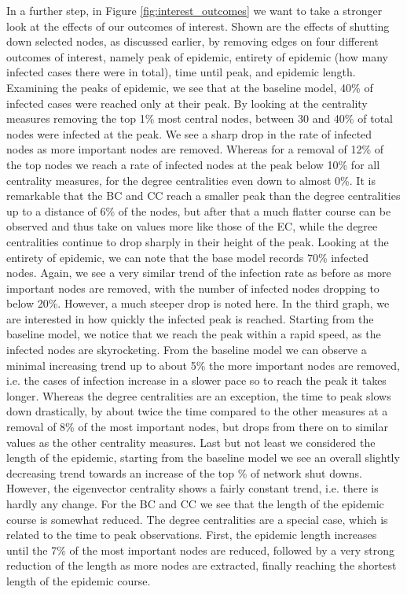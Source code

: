 \documentclass{Resources/netsci-project}
\begin{document}
In a further step, in Figure \ref{fig:interest_outcomes} we want to take a stronger look at the effects of our outcomes of interest. Shown are the effects of shutting down selected nodes, as discussed earlier, by removing edges on four different outcomes of interest, namely peak of epidemic, entirety of epidemic (how many infected cases there were in total), time until peak, and epidemic length.
Examining the peaks of epidemic, we see that at the baseline model, 40\%  of infected cases were reached only at their peak. By looking at the centrality measures removing the top 1\% most central nodes, between 30 and 40\%  of total nodes were infected at the peak. We see a sharp drop in the rate of infected nodes as more important nodes are removed. Whereas for a removal of 12\%  of the top nodes we reach a rate of infected nodes at the peak below 10\%  for all centrality measures, for the degree centralities even down to almost 0\%. It is remarkable that the BC and CC reach a smaller peak than the degree centralities up to a distance of 6\%  of the nodes, but after that a much flatter course can be observed and thus take on values more like those of the EC, while the degree centralities continue to drop sharply in their height of the peak.
Looking at the entirety of epidemic, we can note that the base model records 70\% infected nodes. Again, we see a very similar trend of the infection rate as before as more important nodes are removed, with the number of infected nodes dropping to below 20\%.  However, a much steeper drop is noted here.
In the third graph, we are interested in how quickly the infected peak is reached. Starting from the baseline model, we notice that we reach the peak within a rapid speed, as the infected nodes are skyrocketing. From the baseline model we can observe a minimal increasing trend up to about 5\% the more important nodes are removed, i.e. the cases of infection increase in a slower pace so to reach the peak it takes longer. Whereas the degree centralities are an exception, the time to peak slows down drastically, by about twice the time compared to the other measures at a removal of 8\% of the most important nodes, but drops from there on to similar values as the other centrality measures.
Last but not least we considered the length of the epidemic, starting from the baseline model we see an overall slightly decreasing trend towards an increase of the top \% of network shut downs. However, the eigenvector centrality shows a fairly constant trend, i.e. there is hardly any change. For the BC and CC we see that the length of the epidemic course is somewhat reduced. The degree centralities are a special case, which is related to the time to peak observations. First, the epidemic length increases until the 7\% of the most important nodes are reduced, followed by a very strong reduction of the length as more nodes are extracted, finally reaching the shortest length of the epidemic course.
\end{document}
